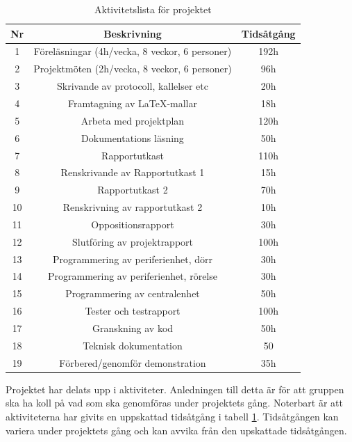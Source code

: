 \documentclass[a4paper]{article}
\begin{document}
\begin{table}[H]
    \begin{center}
        \begin{tabular}{ |c|c|c| }\hline
            Nr & Beskrivning & Tidsåtgång \\\hline\hline
            1 & Föreläsningar (4h/vecka, 8 veckor, 6 personer) & 192h \\\hline
            2 & Projektmöten (2h/vecka, 8 veckor, 6 personer) & 96h \\\hline
            3 & Skrivande av protocoll, kallelser etc & 20h \\\hline
            4 & Framtagning av LaTeX-mallar & 18h \\\hline
            5 & Arbeta med projektplan & 120h \\\hline
            6 & Dokumentations läsning & 50h \\\hline
            7 & Rapportutkast & 110h \\\hline
            8 & Renskrivande av Rapportutkast 1 & 15h \\\hline
            9 & Rapportutkast 2 & 70h\\\hline
            10 & Renskrivning av rapportutkast 2 & 10h \\\hline
            11 & Oppositionsrapport & 30h\\\hline
            12 & Slutföring av projektrapport & 100h\\\hline
            13 & Programmering av periferienhet, dörr & 30h \\\hline
            14 & Programmering av periferienhet, rörelse & 30h \\\hline
            15 & Programmering av centralenhet & 50h \\\hline
            16 & Tester och testrapport & 100h\\\hline
            17 & Granskning av kod & 50h \\\hline
            18 & Teknisk dokumentation & 50 \\\hline
            19 & Förbered/genomför demonstration & 35h \\\hline
        \end{tabular}
        \caption{Aktivitetslista för projektet}
        \label{table:aktivitetslista}
    \end{center}
\end{table}

Projektet har delats upp i aktiviteter. Anledningen till detta är för att gruppen ska ha koll på vad som ska genomföras under projektets gång. Noterbart är att aktiviteterna har givits en uppskattad tidsåtgång i tabell \ref{table:aktivitetslista}. Tidsåtgången kan variera under projektets gång och kan avvika från den upskattade tidsåtgången.
\end{document}
